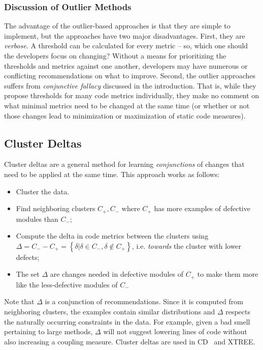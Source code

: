 \documentclass[twocolumn,5p]{elsarticle}
\theoremstyle{break}
\begin{document}
	\subsubsection{Discussion of Outlier Methods}\label{sect:disc}
	The advantage of the outlier-based
	approaches is that they are simple to implement, but the approaches have   two  major disadvantages. 
	First, they are {\em verbose}. A threshold can be calculated for every metric -- so, which one should the developers focus on changing? Without a means for prioritizing the  thresholds and metrics against one another, developers may have numerous or conflicting recommendations on what to improve. Second, the outlier approaches suffers from {\em conjunctive fallacy}  discussed in the introduction. That is, while	they propose thresholds for many code metrics
	individually, they make no comment on what minimal metrics need to be changed at the same time (or whether or not those changes lead to minimization or maximization of static code measures).
	
	
	\subsection{Cluster Deltas}
	
	Cluster deltas are a general method
	for learning {\em conjunctions} of changes
	that need to be applied at the same time. 
	This approach works as follows:
	\begin{itemize}
		\item Cluster the data. 
		\item Find
		neighboring clusters $C_+,C_-$ where $C_+$ has more examples of defective
		modules than $C_-$;
		\item Compute the  delta   in code metrics between the clusters using \mbox{$\Delta = C_- - C_+ = \left\{\delta|\delta\in C_-, \delta \notin C_+\right\}$}, i.e.
		{\em towards} the cluster with lower defects;
		\item The set $\Delta$ are changes needed in defective modules of $C_+$ to
		make them more like the less-defective modules of $C_-$
	\end{itemize}
	Note that $\Delta$ is a conjunction of  recommendations.
	Since it is computed
	from neighboring clusters, the examples contain similar distributions and $\Delta$ respects the naturally occurring constraints in the data. For example,
	given a bad smell pertaining to large methods,   $\Delta$   will not  suggest lowering lines of code
	without also increasing a coupling measure. 
	Cluster deltas are used in CD~\cite{me12c} and XTREE.
	
\end{document}
